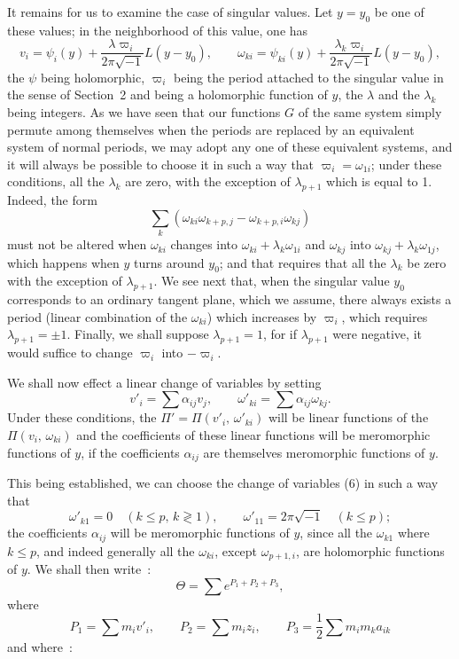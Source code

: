 \documentclass{article}
\begin{document}
It remains for us to examine the case of singular values. Let $y = y_{0}$ be one of these values; in the neighborhood of this value, one has
\[
v_{i} = \psi_{i}(y) + \frac{\lambda \varpi_{i}}{2\pi\sqrt{-1}} L(y - y_{0}), \qquad \omega_{ki} = \psi_{ki}(y) + \frac{\lambda_{k} \varpi_{i}}{2\pi\sqrt{-1}} L(y - y_{0}),
\]
the $\psi$ being holomorphic, $\varpi_{i}$ being the period attached to the singular value in the sense of Section~2 and being a holomorphic function of $y$, the $\lambda$ and the $\lambda_{k}$ being integers. As we have seen that our functions $G$ of the same system simply permute among themselves when the periods are replaced by an equivalent system of normal periods, we may adopt any one of these equivalent systems, and it will always be possible to choose it
in such a way that $\varpi_{i} = \omega_{1i}$; under these conditions, all the $\lambda_{k}$ are zero, with the exception of $\lambda_{p+1}$ which is equal to 1. Indeed, the form
\[
\sum_{k} (\omega_{ki} \omega_{k+p, j} - \omega_{k+p, i} \omega_{kj})
\]
must not be altered when $\omega_{ki}$ changes into $\omega_{ki} + \lambda_{k} \omega_{1i}$ and $\omega_{kj}$ into $\omega_{kj} + \lambda_{k} \omega_{1j}$, which happens when $y$ turns around $y_{0}$; and that requires that all the $\lambda_{k}$ be zero with the exception of $\lambda_{p+1}$. We see next that, when the singular value $y_{0}$ corresponds to an ordinary tangent plane, which we assume, there always exists a period (linear combination of the $\omega_{ki}$) which increases by $\varpi_{i}$, which requires $\lambda_{p+1} = \pm 1$. Finally, we shall suppose $\lambda_{p+1} = 1$, for if $\lambda_{p+1}$ were negative, it would suffice to change $\varpi_{i}$ into $-\varpi_{i}$.

We shall now effect a linear change of variables by setting
\[
v'_{i} = \sum \alpha_{ij} v_{j}, \qquad \omega'_{ki} = \sum \alpha_{ij} \omega_{kj}. \tag{6}
\]
Under these conditions, the $\Pi' = \Pi(v'_{i},\, \omega'_{ki})$ will be linear functions of the $\Pi(v_{i},\, \omega_{ki})$ and the coefficients of these linear functions will be meromorphic functions of $y$, if the coefficients $\alpha_{ij}$ are themselves meromorphic functions of $y$.

This being established, we can choose the change of variables (6) in such a way that
\[
\omega'_{k1} = 0 \quad (k \le p,\, k \gtrless 1), \qquad \omega'_{11} = 2\pi\sqrt{-1} \quad (k \le p);
\]
the coefficients $\alpha_{ij}$ will be meromorphic functions of $y$, since all the $\omega_{k1}$ where $k \le p$, and indeed generally all the $\omega_{ki}$, except $\omega_{p+1, i}$, are holomorphic functions of $y$. We shall then write~:
\[
\Theta = \sum e^{P_{1} + P_{2} + P_{3}},
\]
where
\[
P_{1} = \sum m_{i} v'_{i}, \qquad P_{2} = \sum m_{i} z_{i}, \qquad P_{3} = \frac{1}{2} \sum m_{i} m_{k} a_{ik}
\]
and where~:
\end{document}
